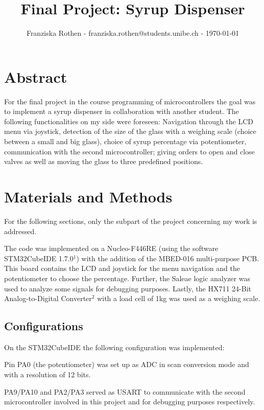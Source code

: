 \documentclass[twocolumn]{article}
\begin{document}
	
	\title{Final Project: Syrup Dispenser}
	
	\author{Franziska Rothen - franziska.rothen@students.unibe.ch - \today}
	
	\maketitle\thispagestyle{empty}
	
	\section*{Abstract}
	For the final project in the course programming of microcontrollers the goal was to implement a syrup dispenser in collaboration with another student. The following functionalities on my side were foreseen: Navigation through the LCD menu via joystick, detection of the size of the glass with a weighing scale (choice between a small and big glass), choice of syrup percentage via potentiometer, communication with the second microcontroller; giving orders to open and close valves as well as moving the glass to three predefined positions. 
	
	\section{Materials and Methods}
	For the following sections, only the subpart of the project concerning my work is addressed.
	
	The code was implemented on a Nucleo-F446RE (using the software STM32CubeIDE 1.7.0$^1$) with the addition of the MBED-016 multi-purpose PCB. This board contains the LCD and joystick for the menu navigation and the potentiometer to choose the percentage. Further, the Saleae logic analyzer was used to analyze some signals for debugging purposes. Lastly, the HX711 24-Bit Analog-to-Digital Converter$^2$ with a load cell of 1kg was used as a weighing scale.	
	
	\subsection{Configurations}
	On the STM32CubeIDE the following configuration was implemented:
	
	Pin PA0 (the potentiometer) was set up as ADC in scan conversion mode and with a resolution of 12 bits.
	
	PA9/PA10 and PA2/PA3 served as USART to communicate with the second microcontroller involved in this project and for debugging purposes respectively. 
	
\end{document}
